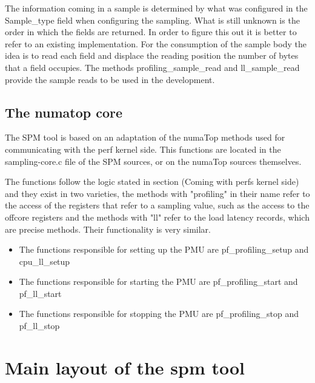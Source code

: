 The information coming in a sample is determined by what was configured in the Sample\_type field when configuring the sampling. What is still unknown is the order in which the fields are returned. In order to figure this out it is better to refer to an existing implementation. For the consumption of the sample body the idea is to read each field and displace the reading position the number of bytes that a field occupies. The methods profiling\_sample\_read and ll\_sample\_read provide the sample reads to be used in the development. 
    
\subsection{The numatop core}\label{section:numatop-core}
The SPM tool is based on an adaptation of the numaTop methods used for communicating with the perf kernel side. This functions are located in the sampling-core.c file of the SPM sources, or on the numaTop sources themselves. 

The functions follow the logic stated in section (Coming with perfs kernel side) and they exist in two varieties, the methods with "profiling" in their name refer to the access of the registers that refer to a sampling value, such as the access to the offcore registers and the methods with "ll" refer to the load latency records, which are precise methods. Their functionality is very similar. 
\begin{itemize}
	\item The functions responsible for setting up the PMU are pf\_profiling\_setup and cpu\_ll\_setup
	\item The functions responsible for starting the PMU are pf\_profiling\_start and pf\_ll\_start 
	\item The functions responsible for stopping the PMU are pf\_profiling\_stop and pf\_ll\_stop
\end{itemize}
  
\section{Main layout of the spm tool }\label{section:ovv-perfks}

